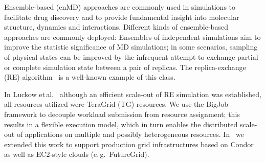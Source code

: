 \documentclass[conference,final]{IEEEtran}
\newcommand{\alnote}[1]{ {\textcolor{blue} { ***AL: #1 }}}
\newcommand{\jhanote}[1]{ {\textcolor{red} { ***SJ: #1 }}}
\newcommand{\alnote}[1]{}
\newcommand{\jhanote}[1]{}
\begin{document}
 





 



Ensemble-based (enMD) approaches are commonly used in simulations to
facilitate drug discovery and to provide fundamental insight into
molecular structure, dynamics and interactions.  Different kinds of
ensemble-based approaches are commonly deployed: Ensembles of
independent simulations aim to improve the statistic significance of
MD simulations; %
in some scenarios, sampling of physical-states can be improved by the
infrequent attempt to exchange partial or complete simulation state
between a pair of replicas. The replica-exchange (RE)
algorithm~\cite{hansmann} is a well-known example of this class. 

In Luckow et\,al.~\cite{repex_ptrsb} although an efficient scale-out
of RE simulation was established, all resources utilized were TeraGrid
(TG) resources. We use the BigJob framework to decouple workload
submission from resource assignment; this results in a flexible
execution model, which in turn enables the distributed scale-out of
applications on multiple and possibly heterogeneous resources.
In~\cite{10.1109/CCGRID.2010.91} we extended this work to support
production grid infrastructures based on Condor as well as EC2-style
clouds (e.\,g.\ FutureGrid).
 
\end{document}
